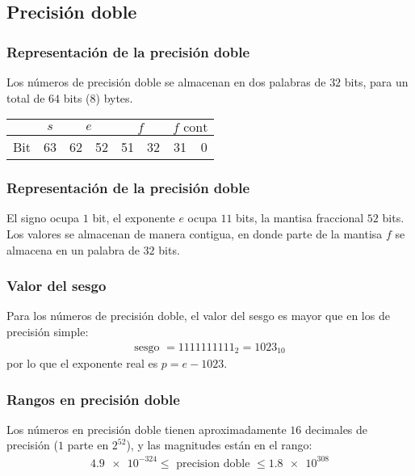 \documentclass[12pt]{beamer}
\begin{document}
\subsection{Precisión doble}

\begin{frame}
\frametitle{Representación de la precisión doble}
Los números de precisión doble se almacenan en dos palabras de $32$ bits, para un total de $64$ bits ($8$) bytes.
\pause
\begin{table}
\fontsize{12}{12}\selectfont
\begin{tabular}{ l | c | c | c | c | c | c | c |}
\cline{2-8}
 {} & $s$ & \multicolumn{2}{c|}{$e$} & \multicolumn{2}{c|}{$f$} & \multicolumn{2}{c|}{$f \text{ cont}$} \\ \hline
 Bit & 63 & 62 & 52 & 51 & 32 & 31 & 0 \\ \hline
\end{tabular}
\end{table}
\end{frame}
\begin{frame}
\frametitle{Representación de la precisión doble}
El signo ocupa $1$ bit, el exponente $e$ ocupa $11$ bits, la mantisa fraccional $52$ bits.
\\
\bigskip
\pause
Los valores se almacenan de manera contigua, en donde parte de la mantisa $f$ se almacena en un palabra de $32$ bits.
\end{frame}
\begin{frame}
\frametitle{Valor del sesgo}
Para los números de precisión doble, el valor del sesgo es mayor que en los de precisión simple:
\pause
\begin{align*}
\text{sesgo } = 1111111111_{2} = 1023_{10}
\end{align*}
por lo que el exponente real es $p = e - 1023$.
\end{frame}
\begin{frame}
\frametitle{Rangos en precisión doble}
Los números en precisión doble tienen aproximadamente $16$ decimales de precisión ($1$ parte en $2^{52}$), y las magnitudes están en el rango:
\pause
\begin{align*}
\num{4.9e-324} \leq \text{ precision doble } \leq \num{1.8e308}
\end{align*}
\end{frame}
\end{document}
